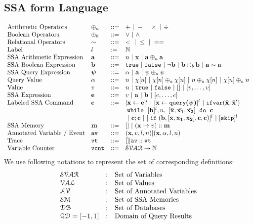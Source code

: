 \subsection{SSA form Language}
\[
\begin{array}{llll}
 \mbox{Arithmetic Operators} 
& \oplus_a & ::= & + ~|~ - ~|~ \times 
%
~|~ \div \\  
\mbox{Boolean Operators} 
& \oplus_b & ::= & \lor ~|~ \land
\\
\mbox{Relational Operators} 
& \sim & ::= & < ~|~ \leq ~|~ == 
\\  
%
\mbox{Label} 
& l & := & \mathbb{N} 
\\ 
%
\mbox{SSA Arithmetic Expression} 
& \saexpr & ::= & 
n ~|~ \ssa{x} ~|~ \saexpr \oplus_a \saexpr  
\\
%
\mbox{SSA Boolean Expression} & \sbexpr & ::= & 
	\etrue ~|~ \efalse  ~|~ \neg \sbexpr
	 ~|~ \sbexpr \oplus_b \sbexpr
	~|~ \saexpr \sim \saexpr 
	\\
%
\mbox{SSA Query Expression} 
& \ssa{\qexpr} & ::= 
& { \qval ~|~ \saexpr ~|~ \qexpr \oplus_a \qexpr} 
\\
%
\mbox{Query Value} & \qval & ::= 
& {n ~|~ \chi[n] ~|~ \chi[n] \oplus_a  \chi[n] ~|~ n \oplus_a  \chi[n]
~|~ \chi[n] \oplus_a  n}
\\
%
\mbox{Value} 
& v & ::= & { n \sep \etrue \sep \efalse ~|~ [] ~|~ [v, \dots, v]}  
\\
%
\mbox{SSA Expression} & \sexpr & ::= & v ~|~ \saexpr \sep \sbexpr ~|~ [\expr, \dots, \expr]
\\	
%
\mbox{Labeled SSA Command} 
& \ssa{c} & ::= &   [\assign {\ssa{x}}{ \ssa{\expr}}]^{l} ~|~  [\assign {\ssa{x} } {\ssa{\query(\qexpr)}}]^{l}
%
~|~  {{\eifvar(\bar{\ssa{x}}, \bar{\ssa{x}}')}} 
\\ 
&&& 
{\ewhile ~ [ \sbexpr ]^{l} , n,
~ 
[\bar{\ssa{x}}, \bar{\ssa{x_1}}, \bar{\ssa{x_2}}] 
~ \edo ~  \ssa{c} }
\\
&&&
~|~ \ssa{c};\ssa{c}  
~|~ [\eif(\sbexpr, [\bar{\ssa{x}}, \bar{\ssa{x_1}}, \bar{\ssa{x_2}}] , \ssa{c}, \ssa{c})]^l 
~|~ [\eskip]^{l} 
\\
%
\mbox{SSA Memory} 
& \ssa{m} & ::= & [] ~|~  (\ssa{x} \to v) :: \ssa{m } 
\\
%
\mbox{Annotated Variable / Event} 
& \av & ::= & (\ssa{x}, v, l, n) | (\ssa{x}, \qval, l, n)
\\
%
\mbox{Trace} & \vtrace
& ::= & [] | \av :: \vtrace
\\
%
\mbox{Variable Counter} & \vcounter
& ::= & \mathcal{SVAR} \to \mathbb{N}
\end{array}
\]
We use following notations to represent the set of corresponding definitions:
\[
\begin{array}{lll}
\mathcal{SVAR} & : & \mbox{Set of Variables}  
\\ 
%
\mathcal{VAL} & : & \mbox{Set of Values} 
\\ 
%
%
 \mathcal{AV}  & : & \mbox{Set of Annotated Variables}  
\\
%
\mathcal{SM}  & : & \mbox{{Set of SSA Memories}} 
\\
%
\dbdom  & : & \mbox{{Set of Databases}} 
\\
%
\qdom = {[-1,1]} & : & \mbox{{Domain of Query Results}}
\end{array}
\]
%
%
